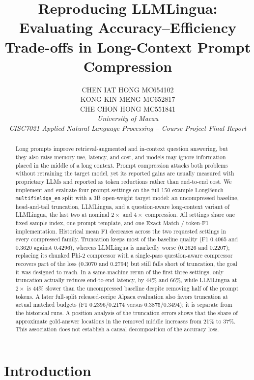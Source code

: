 \documentclass[10pt,a4paper,twocolumn]{article}
\title{Reproducing LLMLingua: Evaluating Accuracy--Efficiency Trade-offs in Long-Context Prompt Compression}
\author{
CHEN IAT HONG \quad MC654102\\
KONG KIN MENG \quad MC652817\\
CHE CHON HONG \quad MC551841\\
\textit{University of Macau}\\
\textit{CISC7021 Applied Natural Language Processing -- Course Project Final Report}
}
\date{}
\begin{document}
\maketitle
\vspace{-0.8cm}

\begin{abstract}
Long prompts improve retrieval-augmented and in-context question answering, but
they also raise memory use, latency, and cost, and models may ignore information
placed in the middle of a long context. Prompt compression attacks both problems
without retraining the target model, yet its reported gains are usually measured
with proprietary LLMs and reported as token reductions rather than end-to-end
cost. We implement and evaluate four prompt settings on the full 150-example
LongBench \texttt{multifieldqa\_en} split with a 3B open-weight target model:
an uncompressed baseline, head-and-tail truncation, LLMLingua, and a
question-aware long-context variant of LLMLingua, the last two at nominal $2\times$
and $4\times$ compression. All settings share one fixed sample index, one prompt
template, and one Exact Match / token-F1 implementation. Historical mean F1 decreases across the two requested settings in every compressed family. Truncation
keeps most of the baseline quality (F1 0.4065 and 0.3620 against 0.4296), whereas
LLMLingua is markedly worse (0.2626 and 0.2207); replacing its chunked Phi-2
compressor with a single-pass question-aware compressor recovers part of the loss
(0.3070 and 0.2794) but still falls short of truncation, the goal it was designed to reach. In a same-machine rerun of
the first three settings, only truncation actually reduces end-to-end latency, by
44\% and 66\%, while LLMLingua at $2\times$ is 44\% slower than the uncompressed
baseline despite removing half of the prompt tokens. A later full-split released-recipe Alpaca evaluation also favors truncation at actual matched budgets (F1 0.2396/0.2174 versus 0.3875/0.3494); it is separate from the historical runs. A position analysis of the
truncation errors shows that the share of approximate gold-answer locations in the removed middle increases from 21\% to 37\%. This association does not establish a causal decomposition of the accuracy loss.
\end{abstract}

\section{Introduction}
\end{document}
